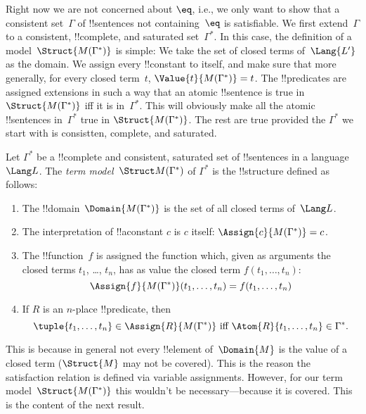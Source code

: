 \documentclass[../../../include/open-logic-section]{subfiles}
\begin{document}


\begin{explain}
Right now we are not concerned about $\eq$, i.e., we only want to show
that a consistent set~$\Gamma$ of !!{sentence}s not containing~$\eq$
is satisfiable. We first extend~$\Gamma$ to a consistent,
!!{complete}, and saturated set~$\Gamma^*$.  In this case, the
definition of a model~$\Struct{M(\Gamma^*)}$ is simple: We take the
set of closed terms of~$\Lang{L'}$ as the domain. We assign every
!!{constant} to itself, and make sure that more generally, for every
closed term~$t$, $\Value{t}{M(\Gamma^*)} = t$.  The !!{predicate}s are
assigned extensions in such a way that an atomic !!{sentence} is true
in $\Struct{M(\Gamma^*)}$ iff it is in~$\Gamma^*$.  This will
obviously make all the atomic !!{sentence}s in~$\Gamma^*$ true in
$\Struct{M(\Gamma^*)}$. The rest are true provided the $\Gamma^*$ we
start with is consistten, complete, and saturated.
\end{explain}

\begin{defn}
Let $\Gamma^*$ be a !!{complete} and consistent,
saturated set of !!{sentence}s in a language~$\Lang L$. The \emph{term
  model}~$\Struct M(\Gamma^*)$ of $\Gamma^*$ is the !!{structure}
defined as follows:
\begin{enumerate}
\item The !!{domain}~$\Domain{M(\Gamma^*)}$ is the set of all closed
  terms of~$\Lang L$.
\item The interpretation of !!a{constant} $c$ is $c$ itself:
  $\Assign{c}{M(\Gamma^*)} = c$.
\item The !!{function}~$f$ is assigned the function which, given as
  arguments the closed terms $t_1$, \dots, $t_n$, has as value the
  closed term $f(t_1, \dots, t_n)$:
\[
\Assign{f}{M(\Gamma^*)}(t_1, \dots, t_n) = f(t_1,\dots, t_n)
\]
\item If $R$ is an $n$-place !!{predicate}, then
  \[
  \tuple{t_1, \dots,
  t_n} \in \Assign{R}{M(\Gamma^*)} \text{ iff } \Atom{R}{t_1, \dots,
    t_n} \in \Gamma^*.
  \]
\end{enumerate}
\end{defn}

\begin{explain}
   This is because in general
  not every !!{element} of~$\Domain{M}$ is the value of a closed term
  ($\Struct{M}$ may not be covered).  This is the reason the
  satisfaction relation is defined via variable assignments. However,
  for our term model~$\Struct{M(\Gamma^*)}$ this wouldn't be
  necessary---because it is covered. This is the content of the next
  result.
\end{explain}
\end{document}
